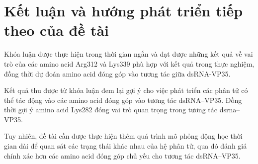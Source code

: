 \documentclass[12pt,a4paper,reqno, oneside]{book}
\begin{document}
%
%
%
%


\newpage
\pagestyle{fancy}
\setcounter{chapter}{3}
\chapter{Kết luận và hướng phát triển tiếp theo của đề tài}

	
	
	Khóa luận được thực hiện trong thời gian ngắn và đạt được những kết quả về vai trò của các amino acid Arg312 và Lys339 phù hợp với kết quả trong thực nghiệm, đồng thời dự đoán amino acid đóng góp vào tương tác giữa dsRNA-VP35.

	Kết quả thu được từ khóa luận đem lại gợi ý cho việc phát triển các phân tử có thể tác động vào các amino acid đóng góp vào tương tác dsRNA--VP35. Đồng thời gợi ý amino acid Lys282 đóng vai trò quan trọng trong tương tác \gls{dsrna}--VP35.
	
	Tuy nhiên, đề tài cần được thực hiện thêm quá trình mô phỏng động học thời gian dài để quan sát các trạng thái khác nhau của hệ phân tử, qua đó đánh giá chính xác hơn các amino acid đóng góp chủ yếu cho tương tác dsRNA--VP35.
	
\end{document}
